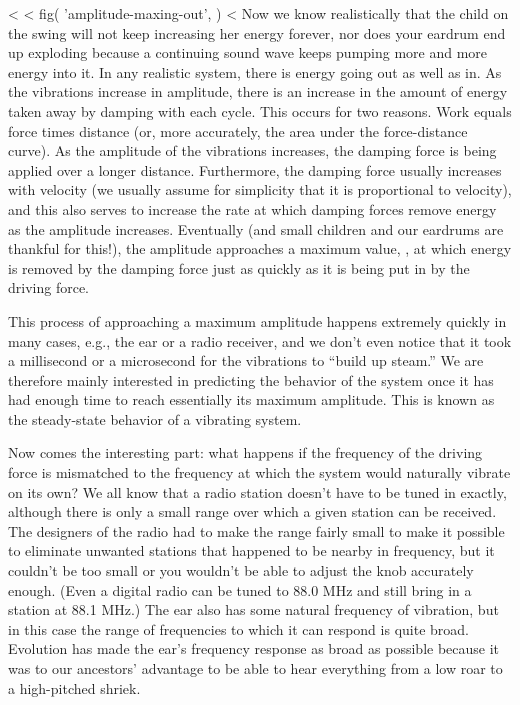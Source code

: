 <%
<%
  fig(
    'amplitude-maxing-out',
  )
<%
Now we know realistically that the child on the swing will
not keep increasing her energy forever, nor does your
eardrum end up exploding because a continuing sound wave
keeps pumping more and more energy into it. In any realistic
system, there is energy going out as well as in. As the
vibrations increase in amplitude, there is an increase in
the amount of energy taken away by damping with each cycle.
This occurs for two reasons. Work equals force times
distance (or, more accurately, the area under the force-distance
curve). As the amplitude of the vibrations increases, the
damping force is being applied over a longer distance.
Furthermore, the damping force usually increases with
velocity (we usually assume for simplicity that it is
proportional to velocity), and this also serves to increase
the rate at which damping forces remove energy as the
amplitude increases. Eventually (and small children and our
eardrums are thankful for this!), the amplitude approaches a
maximum value, , at which energy is removed by the damping
force just as quickly as it is being put in by the driving force.

This process of approaching a maximum amplitude happens
extremely quickly in many cases, e.g., the ear or a radio
receiver, and we don't even notice that it took a millisecond
or a microsecond for the vibrations to ``build up steam.''
We are therefore mainly interested in predicting the
behavior of the system once it has had enough time to reach
essentially its maximum amplitude. This is known as the
steady-state behavior
of a vibrating system.

Now comes the interesting part: what happens if the
frequency of the driving force is mismatched to the
frequency at which the system would naturally vibrate on its
own? We all know that a radio station doesn't have to be
tuned in exactly, although there is only a small range over
which a given station can be received. The designers of the
radio had to make the range fairly small to make it possible to
eliminate unwanted stations that happened to be nearby in
frequency, but it couldn't be too small or you wouldn't be
able to adjust the knob accurately enough. (Even a digital
radio can be tuned to 88.0 MHz and still bring in a station
at 88.1 MHz.) The ear also has some natural frequency of
vibration, but in this case the range of frequencies to
which it can respond is quite broad. Evolution has made the
ear's frequency response as broad as possible because it was
to our ancestors' advantage to be able to hear everything
from a low roar to a high-pitched shriek.

